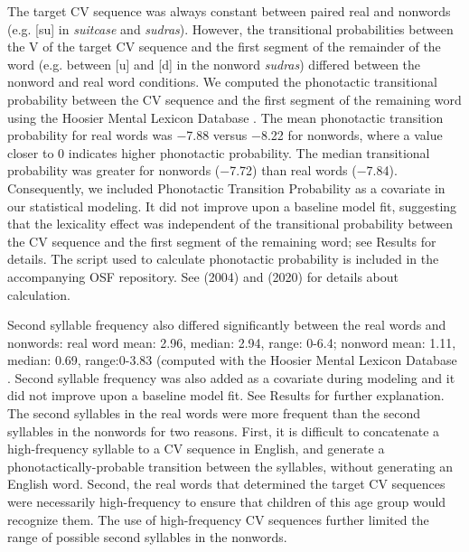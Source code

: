 \documentclass[a4paper,man,natbib,donotrepeattitle, apacite]{apa6}
\begin{document}
The target CV sequence was always constant between paired real and nonwords (e.g. [su] in \textit{suitcase} and \textit{sudras}). However, the transitional probabilities between the V of the target CV sequence and the first segment of the remainder of the word (e.g. between [u] and [d] in the nonword \textit{sudras}) differed between the nonword and real word conditions. We computed the phonotactic transitional probability between the CV sequence and the first segment of the remaining word using the Hoosier Mental Lexicon Database \cite{pisoniSpeechPerceptionWord1985}. The mean phonotactic transition probability for real words was −7.88 versus −8.22 for nonwords, where a value closer to 0 indicates higher phonotactic probability. The median transitional probability was greater for nonwords (−7.72) than real words (−7.84). Consequently, we included Phonotactic Transition Probability as a covariate in our statistical modeling. It did not improve upon a baseline model fit, suggesting that the lexicality effect was independent of the transitional probability between the CV sequence and the first segment of the remaining word; see Results for details. The script used to calculate phonotactic probability is included in the accompanying OSF repository. See \citeauthor{edwardsInteractionVocabularySize2004} (2004) and \citeauthor{cychoszLexicalAdvantageFouryearold2020} (2020) for details about calculation. 

Second syllable frequency also differed significantly between the real words and nonwords: real word mean: 2.96, median: 2.94, range: 0-6.4; nonword mean: 1.11, median: 0.69, range:0-3.83 (computed with the Hoosier Mental Lexicon Database \cite{pisoniSpeechPerceptionWord1985}. Second syllable frequency was also added as a covariate during modeling and it did not improve upon a baseline model fit. See Results for further explanation. The second syllables in the real words were more frequent than the second syllables in the nonwords for two reasons. First, it is difficult to concatenate a high-frequency syllable to a CV sequence in English, and generate a phonotactically-probable transition between the syllables, without generating an English word. Second, the real words that determined the target CV sequences were necessarily high-frequency to ensure that children of this age group would recognize them. The use of high-frequency CV sequences further limited the range of possible second syllables in the nonwords. 
\end{document}
